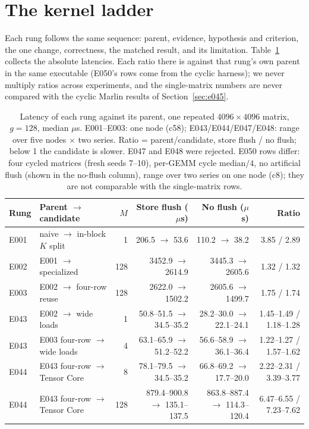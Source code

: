 \documentclass[sigconf,nonacm]{acmart}
\begin{document}
\section{The kernel ladder}
\label{sec:ladder}
Each rung follows the same sequence: parent, evidence, hypothesis and criterion, the one change, correctness, the matched result, and its limitation. Table~\ref{tab:ladder} collects the absolute latencies. Each ratio there is against that rung's own parent in the same executable (E050's rows come from the cyclic harness); we never multiply ratios across experiments, and the single-matrix numbers are never compared with the cyclic Marlin results of Section~\ref{sec:e045}.

\begin{table}[t]
\caption{Latency of each rung against its parent, one repeated $4096\times4096$ matrix, $g=128$, median $\mu$s. E001--E003: one node (c58); E043/E044/E047/E048: range over five nodes $\times$ two series. Ratio = parent/candidate, store flush / no flush; below 1 the candidate is slower. E047 and E048 were rejected. E050 rows differ: four cycled matrices (fresh seeds 7--10), per-GEMM cycle median$/4$, no artificial flush (shown in the no-flush column), range over two series on one node (c8); they are not comparable with the single-matrix rows.}
\label{tab:ladder}
\small
\begin{tabular}{llrrrr}
\toprule
Rung & Parent $\to$ candidate & $M$ & Store flush ($\mu$s) & No flush ($\mu$s) & Ratio \\
\midrule
E001 & naive $\to$ in-block $K$ split & 1 & 206.5 $\to$ 53.6 & 110.2 $\to$ 38.2 & 3.85 / 2.89 \\
E002 & E001 $\to$ specialized & 128 & 3452.9 $\to$ 2614.9 & 3445.3 $\to$ 2605.6 & 1.32 / 1.32 \\
E003 & E002 $\to$ four-row reuse & 128 & 2622.0 $\to$ 1502.2 & 2605.6 $\to$ 1499.7 & 1.75 / 1.74 \\
E043 & E002 $\to$ wide loads & 1 & 50.8--51.5 $\to$ 34.5--35.2 & 28.2--30.0 $\to$ 22.1--24.1 & 1.45--1.49 / 1.18--1.28 \\
E043 & E003 four-row $\to$ wide loads & 4 & 63.1--65.9 $\to$ 51.2--52.2 & 56.6--58.9 $\to$ 36.1--36.4 & 1.22--1.27 / 1.57--1.62 \\
E044 & E043 four-row $\to$ Tensor Core & 8 & 78.1--79.5 $\to$ 34.5--35.2 & 66.8--69.2 $\to$ 17.7--20.0 & 2.22--2.31 / 3.39--3.77 \\
E044 & E043 four-row $\to$ Tensor Core & 128 & 879.4--900.8 $\to$ 135.1--137.5 & 863.8--887.4 $\to$ 114.3--120.4 & 6.47--6.55 / 7.23--7.62 \\

\end{tabular}
\end{table}
\end{document}
